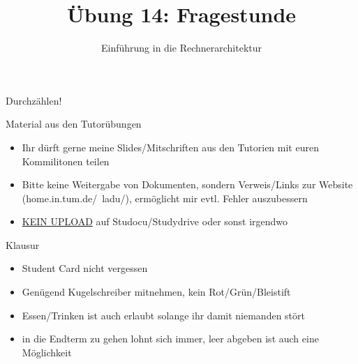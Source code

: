 

\title{Übung 14: Fragestunde}
\subtitle{Einführung in die Rechnerarchitektur}
\date{}



\maketitle

\begin{frame}[c]{}{}
	\begin{center}
		\LARGE  Durchzählen!
	\end{center}
\end{frame}

\begin{frame}[fragile, c]{Material aus den Tutorübungen}{}
	\begin{itemize}
		\item Ihr dürft gerne meine Slides/Mitschriften aus den Tutorien mit
		      euren Kommilitonen teilen
		\item Bitte keine Weitergabe von Dokumenten, sondern Verweis/Links zur Website (home.in.tum.de/\string~ladu/),
		      ermöglicht mir evtl. Fehler auszubessern
		\item \underline{KEIN UPLOAD} auf Studocu/Studydrive oder sonst irgendwo
	\end{itemize}
\end{frame}

\begin{frame}[fragile, c]{Klausur}{}
	\begin{itemize}
		\item Student Card nicht vergessen
		\item Genügend Kugelschreiber mitnehmen, kein Rot/Grün/Bleistift
		\item Essen/Trinken ist auch erlaubt solange ihr damit niemanden stört
		\item in die Endterm zu gehen lohnt sich immer, leer abgeben ist auch eine Möglichkeit
	\end{itemize}
\end{frame}


